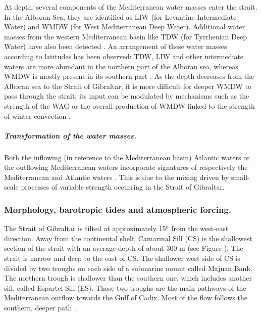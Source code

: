 At depth, several components of the Mediterranean water masses enter the strait. In the Alboran Sea, they are identified as LIW (for Levantine Intermediate Water) and WMDW (for West Mediterranean Deep Water).  Additional water masses from the western Mediterranean basin like TDW (for Tyrrhenian Deep Water) have also been detected \citep{Millot2014}. An arrangement of these water masses according to latitudes has been observed: TDW, LIW and other intermediate waters are more abundant in the northern part of the Alboran sea, whereas WMDW is mostly present in its southern part \citep{Millot2014}. As the depth decreases from the Alboran sea to the Strait of Gibraltar, it is more difficult for deeper WMDW to pass through the strait; its input can be modulated by mechanisms such as the strength of the WAG or the overall production of WMDW linked to the strength of winter convection \citep{naranjo_2012}.

\subparagraph{Transformation of the water masses.}
Both the inflowing (in reference to the Mediterranean basin) Atlantic waters or the outflowing Mediterranean waters incorporate signatures of respectively the Mediterranean \citep{macias_2006} and Atlantic waters \citep{millot_2007,GarciaLafuente2011}. This is due to the mixing driven by small-scale processes of variable strength occurring in the Strait of Gibraltar.  


\subsubsection{Morphology, barotropic tides and atmospheric forcing.} 

The Strait of Gibraltar is tilted at approximately 15$^\text{o}$ from the west-east direction. Away from the continental shelf, Camarinal Sill (CS) is the shallowest section of the strait with an average depth of about 300 m (see Figure ). The strait is narrow and deep to the east of CS. The shallower west side of CS is divided by two troughs on each side of a submarine mount called Majuan Bank. The northern trough is shallower than the southern one, which includes another sill, called Espartel Sill (ES). Those two troughs are the main pathways of the Mediterranean outflow towards the Gulf of Cadix. Most of the flow follows the southern, deeper path \citep{sanchez-roman_2009}.

